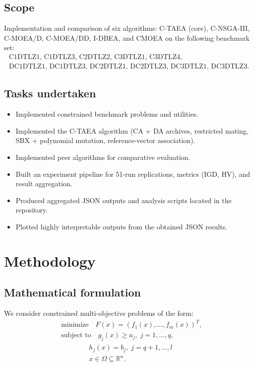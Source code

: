 \documentclass[12pt]{article}
\begin{document}
\subsection*{Scope}
Implementation and comparison of six algorithms: C-TAEA (core), C-NSGA-III, C-MOEA/D, C-MOEA/DD, I-DBEA, and CMOEA on the following benchmark set:
\[
\begin{array}{lll}
\text{C1DTLZ1, C1DTLZ3, C2DTLZ2, C3DTLZ1, C3DTLZ4,} \\
\text{DC1DTLZ1, DC1DTLZ3, DC2DTLZ1, DC2DTLZ3, DC3DTLZ1, DC3DTLZ3.}
\end{array}
\]

\subsection*{Tasks undertaken}
\begin{itemize}
    \item Implemented constrained benchmark problems and utilities.
    \item Implemented the C-TAEA algorithm (CA + DA archives, restricted mating, SBX + polynomial mutation, reference-vector association).
    \item Implemented peer algorithms for comparative evaluation.
    \item Built an experiment pipeline for 51-run replications, metrics (IGD, HV), and result aggregation.
    \item Produced aggregated JSON outputs and analysis scripts located in the repository.
    \item Plotted highly interpretable outputs from the obtained JSON results. 
\end{itemize}


\newpage
\section{Methodology}

\subsection{Mathematical formulation}
We consider constrained multi-objective problems of the form:
\[
\begin{aligned}
&\text{minimize}\quad F(x) = (f_1(x),\dots,f_m(x))^T,\\
&\text{subject to}\quad g_j(x) \ge a_j,\; j=1,\dots,q,\\
&\qquad\qquad h_j(x) = b_j,\; j=q+1,\dots,l\\
&\qquad\qquad x\in\Omega\subseteq\mathbb{R}^n.
\end{aligned}
\]
\end{document}

